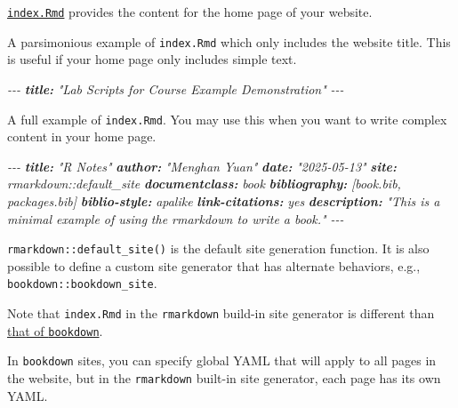 \documentclass[
  a4paper,
  twoside,
  openright]{book}
\newenvironment{Shaded}{\begin{snugshade}}{\end{snugshade}}
\newcommand{\AnnotationTok}[1]{\textcolor[rgb]{0.56,0.35,0.01}{\textbf{\textit{#1}}}}
\newcommand{\CommentTok}[1]{\textcolor[rgb]{0.56,0.35,0.01}{\textit{#1}}}
\theoremstyle{definition}
\theoremstyle{definition}
\theoremstyle{definition}
\theoremstyle{definition}
\theoremstyle{remark}
\begin{document}
\href{https://bookdown.org/yihui/rmarkdown/rmarkdown-site.html\#site-generator-function}{\texttt{index.Rmd}} provides the content for the home page of your website.

A parsimonious example of \texttt{index.Rmd} which only includes the website title. This is useful if your home page only includes simple text.

\begin{Shaded}
\begin{Highlighting}[]
\CommentTok{{-}{-}{-}}
\AnnotationTok{title:}\CommentTok{ "Lab Scripts for Course Example Demonstration"}
\CommentTok{{-}{-}{-}}
\end{Highlighting}
\end{Shaded}

A full example of \texttt{index.Rmd}. You may use this when you want to write complex content in your home page.

\begin{Shaded}
\begin{Highlighting}[]
\CommentTok{{-}{-}{-}}
\AnnotationTok{title:}\CommentTok{ "R Notes"}
\AnnotationTok{author:}\CommentTok{ "Menghan Yuan"}
\AnnotationTok{date:}\CommentTok{ "2025{-}05{-}13"}
\AnnotationTok{site:}\CommentTok{ rmarkdown::default\_site}
\AnnotationTok{documentclass:}\CommentTok{ book}
\AnnotationTok{bibliography:}\CommentTok{ [book.bib, packages.bib]}
\AnnotationTok{biblio{-}style:}\CommentTok{ apalike}
\AnnotationTok{link{-}citations:}\CommentTok{ yes}
\AnnotationTok{description:}\CommentTok{ "This is a minimal example of using}
\CommentTok{  the rmarkdown to write a book."}
\CommentTok{{-}{-}{-}}
\end{Highlighting}
\end{Shaded}

\texttt{rmarkdown::default\_site()} is the default site generation function. It is also possible to define a custom site generator that has alternate behaviors, e.g., \texttt{bookdown::bookdown\_site}.

Note that \texttt{index.Rmd} in the \texttt{rmarkdown} build-in site generator is different than \href{https://bookdown.org/yihui/rmarkdown/bookdown-project.html\#index-file}{that of \texttt{bookdown}}.

In \texttt{bookdown} sites, you can specify global YAML that will apply to all pages in the website, but in the \texttt{rmarkdown} built-in site generator, each page has its own YAML.
\end{document}
